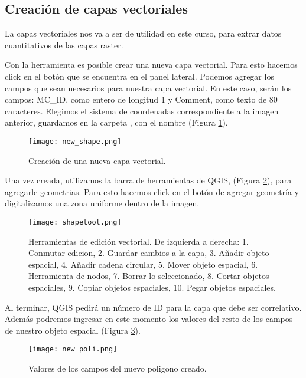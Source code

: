 \subsection{Creaci\'on de capas vectoriales}

La capas vectoriales nos va a ser de utilidad en este curso, para extrar datos
cuantitativos de las capas raster.

Con la herramienta  es posible crear una nueva
capa vectorial. Para esto hacemos click en el bot\'on que se
encuentra en el panel lateral. Podemos agregar los campos que sean necesarios
para nuestra capa vectorial. En este caso, ser\'an los campos: MC\_ID, como
entero de longitud 1 y Comment, como texto de 80 caracteres. Elegimos el sistema
de coordenadas correspondiente a la imagen anterior, guardamos en la carpeta
, con el nombre  (Figura \ref{fig:newshape}).

\begin{figure}[h!]
\begin{center}
    \texttt{[image: new\_shape.png]}
\end{center}
\caption{Creaci\'on de una nueva capa vectorial.}
\label{fig:newshape}
\end{figure}


Una vez creada, utilizamos la barra de herramientas de QGIS, (Figura \ref{fig:shapetool}),
para agregarle geometrias. Para esto hacemos click en el bot\'on
de agregar geometr\'ia y digitalizamos una zona uniforme dentro de la imagen.
\begin{figure}[h!]
\begin{center}
    \texttt{[image: shapetool.png]}
\end{center}
\caption{Herramientas de edición vectorial. De izquierda a derecha: 1. Conmutar
    edicion, 2. Guardar cambios a la capa, 3. Añadir objeto espacial, 4. Añadir
    cadena circular, 5. Mover objeto espacial, 6. Herramienta de nodos, 7.
    Borrar lo seleccionado, 8. Cortar objetos espaciales, 9. Copiar objetos
    espaciales, 10. Pegar objetos espaciales.}
\label{fig:shapetool}
\end{figure}

Al terminar, QGIS pedir\'a un n\'umero de ID para la capa que debe ser
correlativo. Además podremos ingresar en este momento los valores del resto de
los campos de nuestro objeto espacial (Figura \ref{fig:newpoli}).

\begin{figure}[h!]
\begin{center}
\texttt{[image: new\_poli.png]}
\end{center}
\caption{Valores de los campos del nuevo poligono creado.}
\label{fig:newpoli}
\end{figure}

